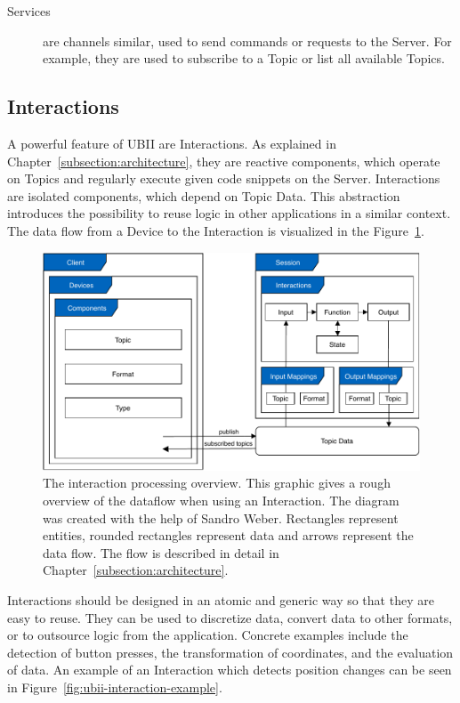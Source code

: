 \begin{description}
	\item[Services] are channels similar, used to send commands or requests to the Server. For example, they are used to subscribe to a Topic or list all available Topics.
\end{description}


\subsection{Interactions}\label{subsection:interactions}
A powerful feature of \gls{UBII} are Interactions. As explained in Chapter~\ref{subsection:architecture}, they are reactive components, which operate on Topics and regularly execute given code snippets on the Server. Interactions are isolated components, which depend on Topic Data. This abstraction introduces the possibility to reuse logic in other applications in a similar context. The data flow from a Device to the Interaction is visualized in the Figure~\ref{fig:ubii-cd}.

\begin{figure}[H]
	\centering
	\includegraphics[width=12cm]{figures/implementation/ubii_cd.pdf}
	\caption[UBII communication diagram]{The interaction processing overview. This graphic gives a rough overview of the dataflow when using an Interaction. The diagram was created with the help of Sandro Weber. Rectangles represent entities, rounded rectangles represent data and arrows represent the data flow. The flow is described in detail in Chapter~\ref{subsection:architecture}.}\label{fig:ubii-cd}
\end{figure}

Interactions should be designed in an atomic and generic way so that they are easy to reuse. They can be used to discretize data, convert data to other formats, or to outsource logic from the application. Concrete examples include the detection of button presses, the transformation of coordinates, and the evaluation of data. An example of an Interaction which detects position changes can be seen in Figure~\ref{fig:ubii-interaction-example}.

